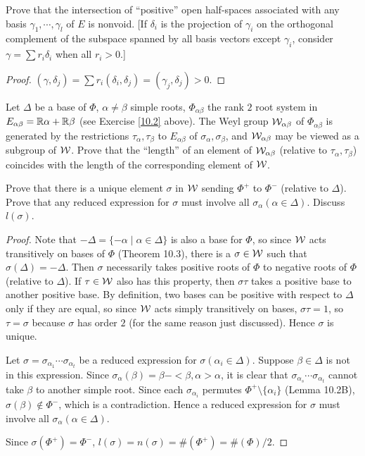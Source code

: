 \begin{ex}
  Prove that the intersection of ``positive'' open half-spaces associated with any basis $\gamma_1,\cdots,\gamma_l$ of $E$ is nonvoid. [If $\delta_i$ is the projection of $\gamma_i$ on the orthogonal complement of the subspace spanned by all basis vectors except $\gamma_i$, consider $\gamma=\sum r_i\delta_i$ when all $r_i > 0$.]
\end{ex}
\begin{proof}
  $(\gamma,\delta_j)=\sum r_i(\delta_i,\delta_j)=(\gamma_j,\delta_j)>0$.
\end{proof}

\begin{ex}
  Let $\Delta$ be a base of $\Phi$, $\alpha\neq\beta$ simple roots, $\Phi_{\alpha\beta}$ the rank $2$ root system in $E_{\alpha\beta} = {\mathbb R}\alpha+{\mathbb R}\beta$ (see Exercise \ref{10.2} above).
  The Weyl group ${\cal W}_{\alpha\beta}$ of $\Phi_{\alpha\beta}$ is generated by the restrictions $\tau_{\alpha}, \tau_{\beta}$ to $E_{\alpha\beta}$ of $\sigma_{\alpha}, \sigma_{\beta}$, and ${\cal W}_{\alpha\beta}$ may be viewed as a subgroup of ${\cal W}$. Prove that the ``length'' of an element of ${\cal W}_{\alpha\beta}$ (relative to $\tau_{\alpha},\tau_{\beta}$) coincides with the length of the corresponding element of ${\cal W}$.
\end{ex}

\begin{ex}
  Prove that there is a unique element $\sigma$ in ${\cal W}$ sending $\Phi^{+}$ to $\Phi^{-}$ (relative to $\Delta$). Prove that any reduced expression for $\sigma$ must involve all $\sigma_{\alpha} (\alpha\in\Delta)$. Discuss $l(\sigma)$.
\end{ex}
\begin{proof}
  Note that $-\Delta=\{-\alpha\mid\alpha\in\Delta\}$ is also a base for $\Phi$, so since ${\cal W}$ acts transitively on bases of $\Phi$ (Theorem 10.3), there is a $\sigma\in{\cal W}$ such that $\sigma(\Delta) = -\Delta$. Then $\sigma$ necessarily takes positive roots of $\Phi$ to negative roots of $\Phi$ (relative to $\Delta$). If $\tau\in{\cal W}$ also has this property, then $\sigma\tau$ takes a positive base to another positive base. By definition, two bases can be positive with respect to $\Delta$ only if they are equal, so since ${\cal W}$ acts simply transitively on bases, $\sigma\tau = 1$, so $\tau=\sigma$ because $\sigma$ has order $2$ (for the same reason just discussed). Hence $\sigma$ is unique.

  Let $\sigma = \sigma_{\alpha_1}\cdots\sigma_{\alpha_t}$ be a reduced expression for $\sigma (\alpha_i \in\Delta)$. Suppose $\beta\in\Delta$ is not in this expression. Since $\sigma_\alpha(\beta) = \beta-<\beta,\alpha>\alpha$, it is clear that $\sigma_{\alpha_s}\cdots\sigma_{\alpha_t}$ cannot take $\beta$ to another simple root. Since each $\sigma_{\alpha_i}$ permutes $\Phi^{+}\setminus\{\alpha_i\}$ (Lemma 10.2B), $\sigma(\beta) \notin \Phi^{-}$, which is a contradiction.
  Hence a reduced expression for $\sigma$ must involve all $\sigma_{\alpha} (\alpha\in\Delta)$.

  Since $\sigma(\Phi^{+})=\Phi^{-}$, $l(\sigma) = n(\sigma) = \#(\Phi^{+}) = \#(\Phi)/2$.
\end{proof}

